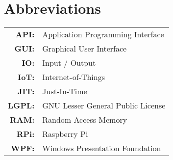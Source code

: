 \renewcommand{\baselinestretch}{1}
\chapter{Abbreviations}

\begin{tabular}{rl}
  \vspace{0.1em} \textbf{API:} & Application Programming Interface \\
  \vspace{0.1em} \textbf{GUI:} & Graphical User Interface \\
  \vspace{0.1em} \textbf{IO:} & Input / Output \\
  \vspace{0.1em} \textbf{IoT:} & Internet-of-Things \\
  \vspace{0.1em} \textbf{JIT:} & Just-In-Time \\
  \vspace{0.1em} \textbf{LGPL:} & GNU Lesser General Public License \\
  \vspace{0.1em} \textbf{RAM:} & Random Access Memory \\
  \vspace{0.1em} \textbf{RPi:} & Raspberry Pi \\
  \vspace{0.1em} \textbf{WPF:} & Windows Presentation Foundation \\
\end{tabular}

